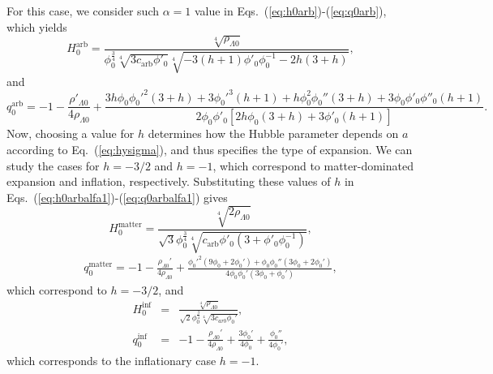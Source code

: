 \documentclass[onecolumn,superscriptaddress,secnumarabic,amssymb,amsmath,nobibnotes,aps,prd,nofootinbib,altaffilletter]{revtex4}
\begin{document}
For this case, we consider such $\alpha=1$ value in Eqs.~(\ref{eq:h0arb})-(\ref{eq:q0arb}), which
yields
\begin{equation}
    H_0^{\text{arb}}=\frac{\sqrt[4]{\rho_{\Lambda 0}}}{\phi_0^{\frac{3}{4}}\sqrt[4]{3c_{\text{arb}}\phi'_0}\sqrt[4]{-3(h+1)\phi'_0 \phi_0^{-1} - 2 h(3+h)}},
    \label{eq:h0arbalfa1}
\end{equation}
and
\begin{equation}
    q_0^{\text{arb}} = -1-\frac{\rho'_{\Lambda 0}}{4\rho_{\Lambda 0}}+ \frac{3h\phi_0{\phi_0'}^2(3+h)+3{\phi_0'}^3(h+1)+h\phi_0^2\phi_0''(3+h)+3\phi_0 \phi'_0 \phi''_0(h+1)}{2\phi_0\phi'_0\left[2h\phi_0(3+h) + 3\phi'_0(h+1)\right]}.
    \label{eq:q0arbalfa1}
\end{equation}
Now, choosing a value for $h$ determines how the Hubble parameter depends on $a$ according to Eq.~(\ref{eq:hysigma}), and thus specifies the type of expansion. We can study the cases for $h=-3/2$ and $h=-1$, which correspond to matter-dominated expansion and inflation, respectively.
Substituting these values of $h$ in Eqs.~(\ref{eq:h0arbalfa1})-(\ref{eq:q0arbalfa1}) gives
\begin{equation}
    H_0^{\text{matter}} = \frac{\sqrt[4]{2\rho_{\Lambda 0}}}{\sqrt{3}\phi_0^{\frac{3}{4}}\sqrt[4]{c_{\text{arb}}\phi'_0\left(3+\phi'_0 \phi_0^{-1}\right)}},
    \label{eq:h0matteralfa1}
\end{equation}
\begin{eqnarray}
    q_0^{\text{matter}} = -1-\frac{\rho_{\Lambda 0}'}{4\rho_{\Lambda 0}} + \frac{{\phi_0'}^2(9\phi_0 + 2\phi_0')+\phi_0 \phi_0''(3\phi_0 + 2\phi_0')}{4\phi_0\phi_0'(3\phi_0 + \phi_0')},
    \label{eq:q0matteralfa1}
\end{eqnarray}
which correspond to $h=-3/2$, and
\begin{eqnarray}
    H_0^{\text{inf}}&=&\frac{\sqrt[4]{\rho_{\Lambda 0}}}{\sqrt{2}\phi_0^{\frac{3}{4}}\sqrt[4]{3c_{arb}\phi_0'}},
    \label{eq:h0infalfa1}\\
    q_0^{\text{inf}}&=&-1-\frac{\rho_{\Lambda 0}'}{4\rho_{\Lambda 0}} + \frac{3\phi_0'}{4\phi_0} + \frac{\phi_0''}{4\phi_0'},
    \label{eq:q0infalfa1}
\end{eqnarray}
which corresponds to the inflationary case $h=-1$.
\end{document}
